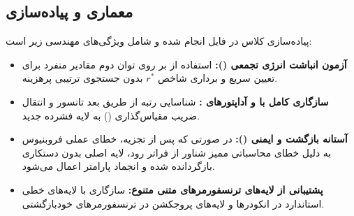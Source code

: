 \subsection{معماری و پیاده‌سازی}
پیاده‌سازی کلاس  در فایل  انجام شده و شامل ویژگی‌های مهندسی زیر است:
\begin{itemize}
    \item \textbf{آزمون انباشت انرژی تجمعی ():} استفاده از  بر روی توان دوم مقادیر منفرد برای تعیین سریع و برداری شاخص $r^*$ بدون جستجوی ترتیبی پرهزینه.
    \item \textbf{سازگاری کامل با  و آداپتورهای :} شناسایی رتبه  از طریق بعد تانسور  و انتقال ضریب مقیاس‌گذاری () به لایه فشرده جدید.
    \item \textbf{آستانه بازگشت و ایمنی ():} در صورتی که پس از تجزیه، خطای عملی فروبنیوس به دلیل خطای محاسباتی ممیز شناور از  فراتر رود، لایه اصلی بدون دستکاری بازگردانده شده و انجماد پارامتر اعمال می‌شود.
    \item \textbf{پشتیبانی از لایه‌های ترنسفورمرهای متنی متنوع:} سازگاری با لایه‌های خطی استاندارد در انکودرها و لایه‌های پروجکشن  در ترنسفورمرهای خودبازگشتی.
\end{itemize}
